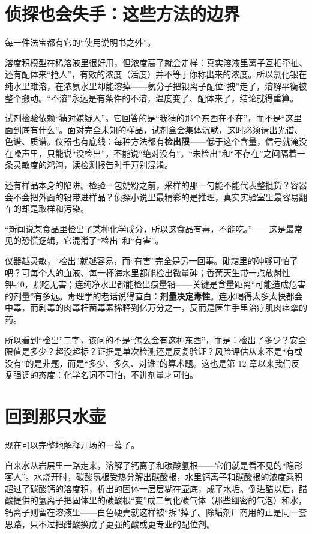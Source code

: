 \section{侦探也会失手：这些方法的边界}

每一件法宝都有它的“使用说明书之外”。

溶度积模型在稀溶液里很好用，但浓度高了就会走样：真实溶液里离子互相牵扯、还有配体来“抢人”，有效的浓度（活度）并不等于你称出来的浓度。所以氯化银在纯水里难溶，在浓氨水里却能溶掉——氨分子把银离子配位“拽”走了，溶解平衡被整个搬动。“不溶”永远是有条件的不溶，温度变了、配体来了，结论就得重算。

试剂检验依赖“猜对嫌疑人”。它回答的是“我猜的那个东西在不在”，而不是“这里面到底有什么”。面对完全未知的样品，试剂盒会集体沉默，这时必须请出光谱、色谱、质谱。仪器也有底线：每种方法都有\textbf{检出限}——低于这个含量，信号就淹没在噪声里，只能说“没检出”，不能说“绝对没有”。“未检出”和“不存在”之间隔着一条灵敏度的鸿沟，读检测报告时千万别混淆。

还有样品本身的陷阱。检验一包奶粉之前，采样的那一勺能不能代表整批货？容器会不会把外面的铅带进样品？侦探小说里最精彩的是推理，真实实验室里最容易翻车的却是取样和污染。

\begin{wuqu}
“新闻说某食品里检出了某种化学成分，所以这食品有毒，不能吃。”——这是最常见的恐慌逻辑，它混淆了“检出”和“有害”。

仪器越灵敏，“检出”就越容易，而“有害”完全是另一回事。砒霜里的砷够可怕了吧？可每个人的血液、每一杯海水里都能检出微量砷；香蕉天生带一点放射性钾-40，照吃无害；连纯净水里都能检出痕量铅——关键是含量距离“可能造成危害的剂量”有多远。毒理学的老话说得直白：\textbf{剂量决定毒性}。连水喝得太多太快都会中毒，而剧毒的肉毒杆菌毒素稀释到亿万分之一，反而是医生手里治疗肌肉痉挛的药。

所以看到“检出”二字，该问的不是“怎么会有这种东西”，而是：检出了多少？安全限值是多少？超没超标？证据是单次检测还是反复验证？风险评估从来不是“有或没有”的是非题，而是“多少、多久、对谁”的算术题。这也是第 12 章以来我们反复强调的态度：化学名词不可怕，不讲剂量才可怕。
\end{wuqu}

\section{回到那只水壶}

现在可以完整地解释开场的一幕了。

自来水从岩层里一路走来，溶解了钙离子和碳酸氢根——它们就是看不见的“隐形客人”。水烧开时，碳酸氢根受热分解出碳酸根，水里钙离子和碳酸根的浓度乘积超过了碳酸钙的溶度积，析出的固体一层层糊在壶底，成了水垢。倒进醋以后，醋酸提供的氢离子把固体里的碳酸根“变”成二氧化碳气体（那些细密的气泡）和水，钙离子则留在溶液里——白色硬壳就这样被“拆”掉了。除垢剂厂商用的正是同一套思路，只不过把醋酸换成了更强的酸或更专业的配位剂。

